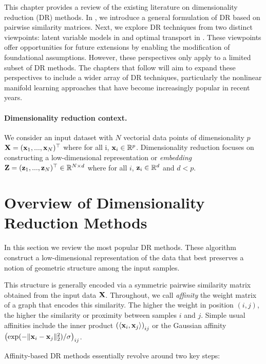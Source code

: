 \newpage

This chapter provides a review of the existing literature on dimensionality reduction (DR) methods. In , we introduce a general formulation of DR based on pairwise similarity matrices. Next, we explore DR techniques from two distinct viewpoints: latent variable models in  and optimal transport in . These viewpoints offer opportunities for future extensions by enabling the modification of foundational assumptions. However, these perspectives only apply to a limited subset of DR methods. The chapters that follow will aim to expand these perspectives to include a wider array of DR techniques, particularly the nonlinear manifold learning approaches that have become increasingly popular in recent years.


\paragraph{Dimensionality reduction context.}
We consider an input dataset with $N$ vectorial data points of dimensionality $p$ \ie ${\mathbf{X}} = ({\mathbf{x}}_1, ..., {\mathbf{x}}_N) ^\top$ where for all i, ${\mathbf{x}}_i \in \mathbb{R}^{p}$. Dimensionality reduction focuses on constructing a low-dimensional representation or \emph{embedding} ${\mathbf{Z}} = ({\mathbf{z}}_1, ..., {\mathbf{z}}_N)^\top \in \mathbb{R}^{N \times d}$ where for all $i$, ${\mathbf{z}}_i \in \mathbb{R}^{d}$ and $d < p$.

\section{Overview of Dimensionality Reduction Methods}\label{sec:background_dr}

In this section we review the most popular DR methods. These algorithm construct a low-dimensional representation of the data that best preserves a notion of geometric structure among the input samples. 

This structure is generally encoded via a symmetric pairwise similarity matrix obtained from the input data ${\mathbf{X}}$. Throughout, we call \emph{affinity} the weight matrix of a graph that encodes this similarity. The higher the weight in position $(i,j)$, the
higher the similarity or proximity between samples $i$ and $j$. Simple usual affinities include the inner product $\left( \langle {\mathbf{x}}_i, {\mathbf{x}}_j \rangle \right)_{ij}$ or the Gaussian affinity $\left( \exp(-\|{\mathbf{x}}_i - {\mathbf{x}}_j\|_2^2) / \sigma \right)_{ij}$.

Affinity-based DR methods essentially revolve around two key steps:

